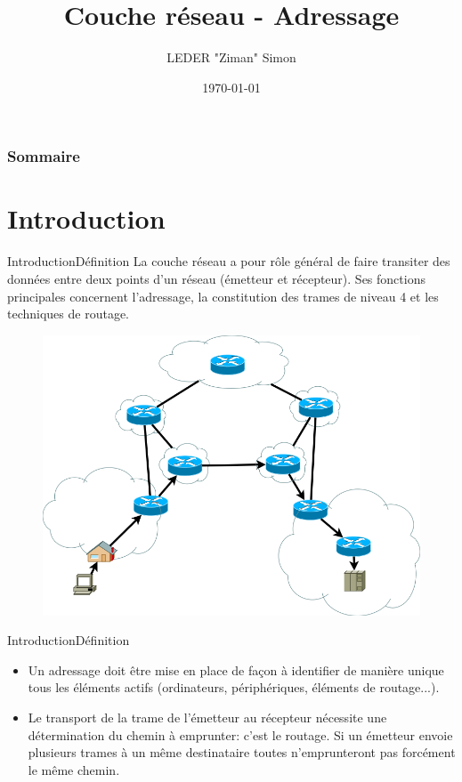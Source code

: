 \documentclass{beamer}
\title{Couche réseau - Adressage}
\author{LEDER "Ziman" Simon}
\institute{Rezoleo\\}
\date{\today}
\begin{document}
	
	\maketitle

	\begin{frame}
		\frametitle{Sommaire}
		\tableofcontents
	\end{frame}

\section{Introduction}
	\begin{frame}{Introduction}{Définition}
		La couche réseau a pour rôle général de faire transiter des données entre deux points d'un réseau (émetteur et récepteur). Ses fonctions principales concernent l'adressage, la constitution des trames de niveau 4 et les techniques de routage.
		\begin{figure}
			\includegraphics[scale = 0.2]{router.png}
		\end{figure}
	\end{frame}

	\begin{frame}{Introduction}{Définition}
		\begin{itemize}
			\item[\textbullet] Un adressage doit être mise en place de façon à identifier de manière unique tous les éléments actifs (ordinateurs, périphériques, éléments de routage...). 
			\item[\textbullet] Le transport de la trame de l'émetteur au récepteur nécessite une détermination du chemin à emprunter: c’est le routage. Si un émetteur envoie plusieurs trames à un même destinataire toutes n'emprunteront pas forcément le même chemin.
		\end{itemize}
	\end{frame}
\end{document}
